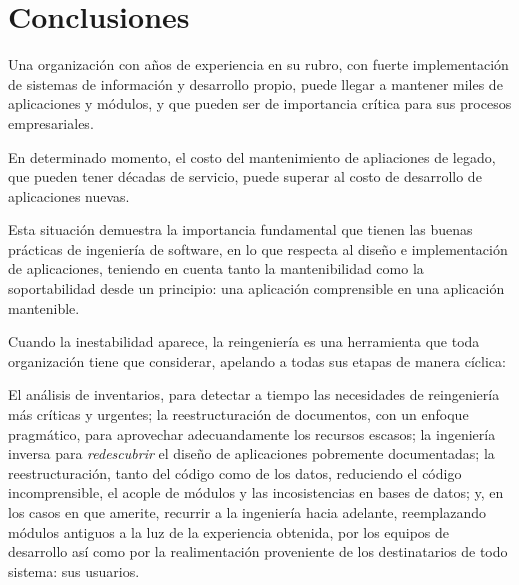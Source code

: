 \section{Conclusiones}

Una organización con años de experiencia en su rubro,
con fuerte implementación de sistemas de información y desarrollo propio,
puede llegar a mantener miles de aplicaciones y módulos,
y que pueden ser de importancia crítica para sus procesos empresariales.

En determinado momento,
el costo del mantenimiento de apliaciones de legado,
que pueden tener décadas de servicio,
puede superar al costo de desarrollo de aplicaciones nuevas.

Esta situación demuestra la importancia fundamental que tienen las buenas 
prácticas de ingeniería de software,
en lo que respecta al diseño e implementación de aplicaciones,
teniendo en cuenta tanto la mantenibilidad como la soportabilidad desde 
un principio: una aplicación comprensible en una aplicación mantenible.

Cuando la inestabilidad aparece, la reingeniería es una herramienta que 
toda organización tiene que considerar,
apelando a todas sus etapas de manera cíclica:

El análisis de inventarios,
para detectar a tiempo las necesidades de reingeniería más críticas y urgentes;
la reestructuración de documentos, con un enfoque pragmático,
para aprovechar adecuandamente los recursos escasos;
la ingeniería inversa para \textit{redescubrir} el diseño de aplicaciones 
pobremente documentadas;
la reestructuración, tanto del código como de los datos,
reduciendo el código incomprensible,
el acople de módulos y las incosistencias en bases de datos;
y, en los casos en que amerite,
recurrir a la ingeniería hacia adelante,
reemplazando módulos antiguos a la luz de la experiencia obtenida,
por los equipos de desarrollo así como por la realimentación proveniente 
de los destinatarios de todo sistema: sus usuarios.
